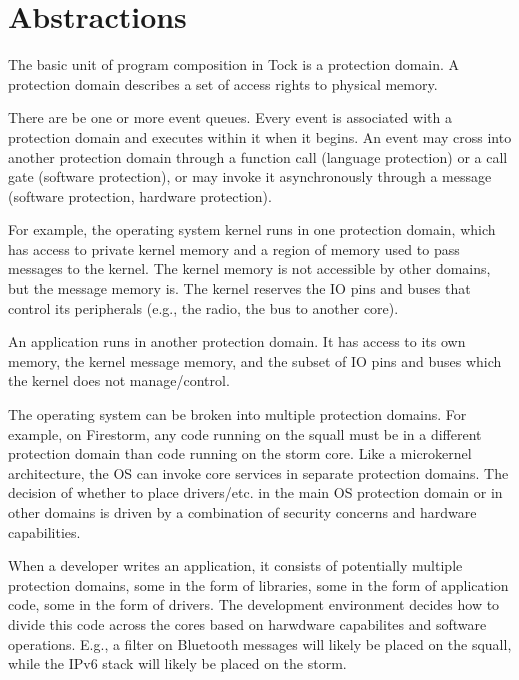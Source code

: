 \documentclass{article}
\begin{document}
\section{Abstractions}

The basic unit of program composition in Tock is a protection domain. A
protection domain describes a set of access rights to physical memory. 

There are be one or more event queues. Every event is associated with
a protection domain and executes within it when it begins. An event
may cross into another protection domain through a function call
(language protection) or a call gate (software protection), or
may invoke it asynchronously through a message (software protection,
hardware protection).

For example, the operating system kernel runs in one protection domain,
which has access to private kernel memory and a region of memory used to
pass messages to the kernel. The kernel memory is not accessible by other
domains, but the message memory is. The kernel reserves the IO pins and buses
that control its peripherals (e.g., the radio, the bus to another core). 

An application runs in another protection domain. It has access to its own
memory, the kernel message memory, and the subset of IO pins and buses
which the kernel does not manage/control.

The operating system can be broken into multiple protection domains. For
example, on Firestorm, any code running on the squall must be in a different
protection domain than code running on the storm core. Like a microkernel
architecture, the OS can invoke core services in separate protection domains.
The decision of whether to place drivers/etc. in the main OS protection domain
or in other domains is driven by a combination of security concerns and 
hardware capabilities.

When a developer writes an application, it consists of potentially multiple
protection domains, some in the form of libraries, some in the form of
application code, some in the form of drivers. The development environment
decides how to divide this code across the cores based on harwdware capabilites
and software operations. E.g., a filter on Bluetooth messages will likely be 
placed on the squall, while the IPv6 stack will likely be placed on the storm.
\end{document}
